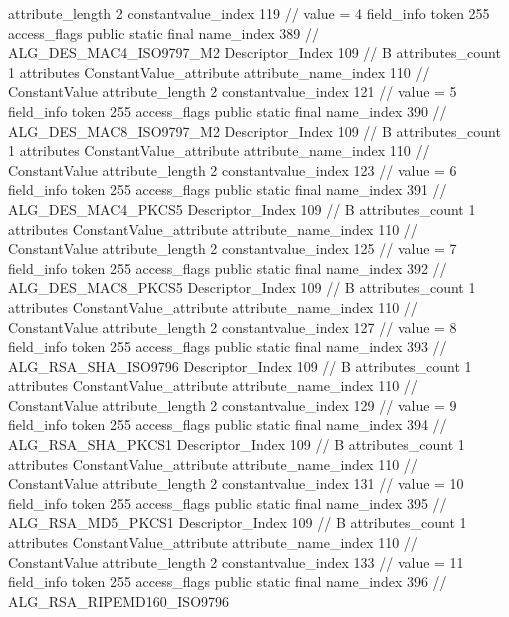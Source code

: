 {{{{{{{					attribute_length	2
					constantvalue_index	119		// value = 4
				}
				}
			}
			field_info {
				token	255
				access_flags	public static final
				name_index	389		// ALG_DES_MAC4_ISO9797_M2
				Descriptor_Index	109		// B
				attributes_count	1
				attributes {
				ConstantValue_attribute {
					attribute_name_index	110		// ConstantValue
					attribute_length	2
					constantvalue_index	121		// value = 5
				}
				}
			}
			field_info {
				token	255
				access_flags	public static final
				name_index	390		// ALG_DES_MAC8_ISO9797_M2
				Descriptor_Index	109		// B
				attributes_count	1
				attributes {
				ConstantValue_attribute {
					attribute_name_index	110		// ConstantValue
					attribute_length	2
					constantvalue_index	123		// value = 6
				}
				}
			}
			field_info {
				token	255
				access_flags	public static final
				name_index	391		// ALG_DES_MAC4_PKCS5
				Descriptor_Index	109		// B
				attributes_count	1
				attributes {
				ConstantValue_attribute {
					attribute_name_index	110		// ConstantValue
					attribute_length	2
					constantvalue_index	125		// value = 7
				}
				}
			}
			field_info {
				token	255
				access_flags	public static final
				name_index	392		// ALG_DES_MAC8_PKCS5
				Descriptor_Index	109		// B
				attributes_count	1
				attributes {
				ConstantValue_attribute {
					attribute_name_index	110		// ConstantValue
					attribute_length	2
					constantvalue_index	127		// value = 8
				}
				}
			}
			field_info {
				token	255
				access_flags	public static final
				name_index	393		// ALG_RSA_SHA_ISO9796
				Descriptor_Index	109		// B
				attributes_count	1
				attributes {
				ConstantValue_attribute {
					attribute_name_index	110		// ConstantValue
					attribute_length	2
					constantvalue_index	129		// value = 9
				}
				}
			}
			field_info {
				token	255
				access_flags	public static final
				name_index	394		// ALG_RSA_SHA_PKCS1
				Descriptor_Index	109		// B
				attributes_count	1
				attributes {
				ConstantValue_attribute {
					attribute_name_index	110		// ConstantValue
					attribute_length	2
					constantvalue_index	131		// value = 10
				}
				}
			}
			field_info {
				token	255
				access_flags	public static final
				name_index	395		// ALG_RSA_MD5_PKCS1
				Descriptor_Index	109		// B
				attributes_count	1
				attributes {
				ConstantValue_attribute {
					attribute_name_index	110		// ConstantValue
					attribute_length	2
					constantvalue_index	133		// value = 11
				}
				}
			}
			field_info {
				token	255
				access_flags	public static final
				name_index	396		// ALG_RSA_RIPEMD160_ISO9796
}}}}}
